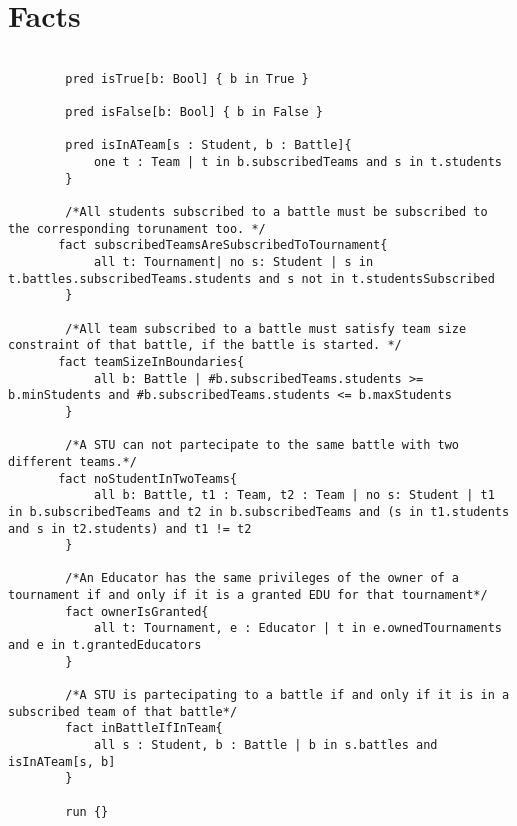 \section[Facts]{Facts}
    \begin{lstlisting}[language=Alloy,  label={lst:alloycode}, basicstyle=\fontfamily{Roboto}\selectfont\ttfamily]
        
        pred isTrue[b: Bool] { b in True }

        pred isFalse[b: Bool] { b in False }
        
        pred isInATeam[s : Student, b : Battle]{
            one t : Team | t in b.subscribedTeams and s in t.students
        }
        
        /*All students subscribed to a battle must be subscribed to the corresponding torunament too. */
       fact subscribedTeamsAreSubscribedToTournament{
            all t: Tournament| no s: Student | s in t.battles.subscribedTeams.students and s not in t.studentsSubscribed
        }

        /*All team subscribed to a battle must satisfy team size constraint of that battle, if the battle is started. */
       fact teamSizeInBoundaries{
            all b: Battle | #b.subscribedTeams.students >= b.minStudents and #b.subscribedTeams.students <= b.maxStudents
        }

        /*A STU can not partecipate to the same battle with two different teams.*/
       fact noStudentInTwoTeams{
            all b: Battle, t1 : Team, t2 : Team | no s: Student | t1 in b.subscribedTeams and t2 in b.subscribedTeams and (s in t1.students and s in t2.students) and t1 != t2
        }
        
        /*An Educator has the same privileges of the owner of a tournament if and only if it is a granted EDU for that tournament*/
        fact ownerIsGranted{
            all t: Tournament, e : Educator | t in e.ownedTournaments and e in t.grantedEducators
        }

        /*A STU is partecipating to a battle if and only if it is in a subscribed team of that battle*/
        fact inBattleIfInTeam{
            all s : Student, b : Battle | b in s.battles and isInATeam[s, b]
        }

        run {}
    \end{lstlisting}